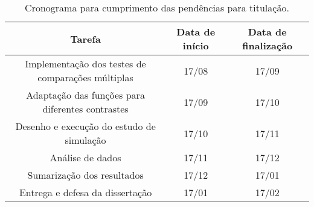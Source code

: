 \begin{table}[H]
\centering
\begin{tabular}{ccc}
\hline
\textbf{Tarefa}                                   & \textbf{Data de início} & \textbf{Data de finalização} \\ \hline
Implementação dos testes de comparações múltiplas & 17/08                   & 17/09                        \\
Adaptação das funções para diferentes contrastes  & 17/09                   & 17/10                        \\
Desenho e execução do estudo de simulação         & 17/10                   & 17/11                        \\
Análise de dados                                  & 17/11                   & 17/12                        \\
Sumarização dos resultados                        & 17/12                   & 17/01                        \\
Entrega e defesa da dissertação                   & 17/01                   & 17/02                        \\ \hline
\end{tabular}
\caption{Cronograma para cumprimento das pendências para titulação.}
\label{tab:crono}
\end{table}